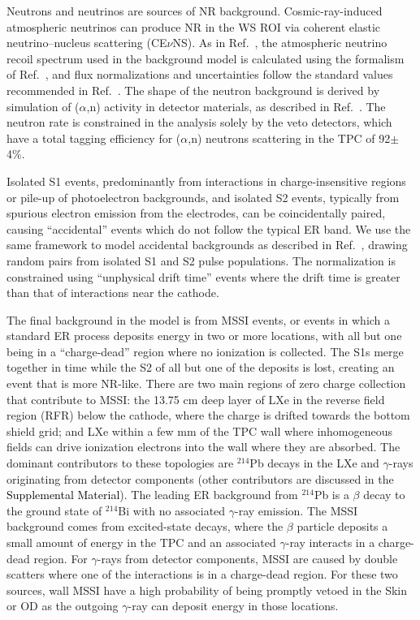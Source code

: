 Neutrons and neutrinos are sources of NR background. 
Cosmic-ray-induced atmospheric neutrinos can produce NR in the WS ROI via coherent elastic neutrino--nucleus scattering (CE$\nu$NS).  
As in Ref.~\cite{LZ:SR3_WS2024}, the atmospheric neutrino recoil spectrum used in the background model is calculated using the formalism of Ref.~\cite{Billard:2013qya}, and flux normalizations and uncertainties follow the standard values recommended in Ref.~\cite{DM_parameters:BAXTER2021_Conventions}.
The shape of the neutron background is derived by simulation of ($\alpha$,n) activity in detector materials, as described in Ref.~\cite{LZ:SR3_WS2024}. 
The neutron rate is constrained in the analysis solely by the veto detectors, which have a total tagging efficiency for ($\alpha$,n) neutrons scattering in the TPC of 92$\pm$4\%. 


Isolated S1 events, predominantly from interactions in charge-insensitive regions or pile-up of photoelectron backgrounds, and isolated S2 events, typically from spurious electron emission from the electrodes, can be coincidentally paired, causing ``accidental'' events which do not follow the typical ER band.
We use the same framework to model accidental backgrounds as described in Ref.~\cite{LZ:SR3_WS2024}, drawing random pairs from isolated S1 and S2 pulse populations.
The normalization is constrained using ``unphysical drift time'' events where the drift time is greater than that of interactions near the cathode.


The final background in the model is from MSSI events, or events in which a standard ER process deposits energy in two or more locations, with all but one being in a ``charge-dead'' region where no ionization is collected.
The S1s merge together in time while the S2 of all but one of the deposits is lost, creating an event that is more NR-like.
There are two main regions of zero charge collection that contribute to MSSI: the 13.75 cm deep layer of LXe in the reverse field region (RFR) below the cathode, where the charge is drifted towards the bottom shield grid; and LXe within a few mm of the TPC wall where inhomogeneous fields can drive ionization electrons into the wall where they are absorbed.
The dominant contributors to these topologies are $^{214}$Pb decays in the LXe and $\gamma$-rays originating from detector components (other contributors are discussed in the \textcolor{black}{Supplemental Material}).
The leading ER background from $^{214}$Pb is a $\beta$ decay to the ground state of $^{214}$Bi with no associated $\gamma$-ray emission.
The MSSI background comes from excited-state decays, where the $\beta$ particle deposits a small amount of energy in the TPC and an associated $\gamma$-ray interacts in a charge-dead region.
For $\gamma$-rays from detector components, MSSI are caused by double scatters where one of the interactions is in a charge-dead region.
For these two sources, wall MSSI have a high probability of being promptly vetoed in the Skin or OD as the outgoing $\gamma$-ray can deposit energy in those locations. 

